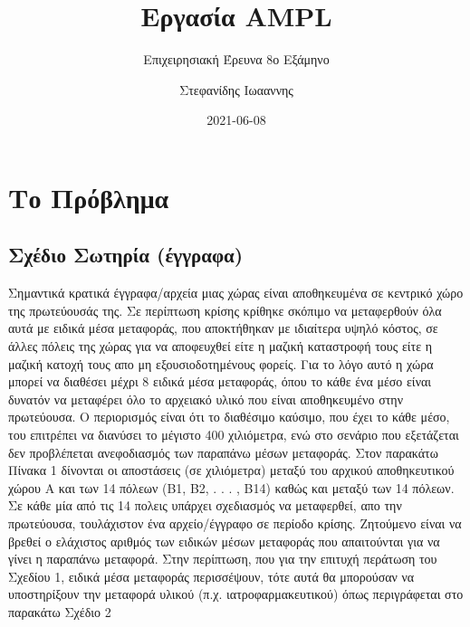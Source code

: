 \documentclass[
]{article}
\title{Εργασία AMPL}
\subtitle{Επιχειρησιακή Έρευνα 8ο Εξάμηνο}
\author{Στεφανίδης Ιωααννης}
\date{2021-06-08}
\begin{document}
\maketitle

{
\setcounter{tocdepth}{2}
\tableofcontents
}
\hypertarget{ux3c4ux3bf-ux3c0ux3c1ux3ccux3b2ux3bbux3b7ux3bcux3b1}{%
\section{Το Πρόβλημα}\label{ux3c4ux3bf-ux3c0ux3c1ux3ccux3b2ux3bbux3b7ux3bcux3b1}}

\hypertarget{ux3c3ux3c7ux3adux3b4ux3b9ux3bf-ux3c3ux3c9ux3c4ux3b7ux3c1ux3afux3b1-ux3adux3b3ux3b3ux3c1ux3b1ux3c6ux3b1}{%
\subsection{Σχέδιο Σωτηρία (έγγραφα)}\label{ux3c3ux3c7ux3adux3b4ux3b9ux3bf-ux3c3ux3c9ux3c4ux3b7ux3c1ux3afux3b1-ux3adux3b3ux3b3ux3c1ux3b1ux3c6ux3b1}}

Σημαντικά κρατικά έγγραφα/αρχεία μιας χώρας είναι αποθηκευμένα σε κεντρικό χώρο
της πρωτεύουσάς της. Σε περίπτωση κρίσης κρίθηκε σκόπιμο να μεταφερθούν όλα
αυτά με ειδικά μέσα μεταφοράς, που αποκτήθηκαν με ιδιαίτερα υψηλό κόστος, σε
άλλες πόλεις της χώρας για να αποφευχθεί είτε η μαζική καταστροφή τους είτε η
μαζική κατοχή τους απο μη εξουσιοδοτημένους φορείς. Για το λόγο αυτό η χώρα
μπορεί να διαθέσει μέχρι 8 ειδικά μέσα μεταφοράς, όπου το κάθε ένα μέσο είναι
δυνατόν να μεταφέρει όλο το αρχειακό υλικό που είναι αποθηκευμένο στην
πρωτεύουσα. Ο περιορισμός είναι ότι το διαθέσιμο καύσιμο, που έχει το κάθε
μέσο, του επιτρέπει να διανύσει το μέγιστο 400 χιλιόμετρα, ενώ στο σενάριο που
εξετάζεται δεν προβλέπεται ανεφοδιασμός των παραπάνω μέσων μεταφοράς. Στον
παρακάτω Πίνακα 1 δίνονται οι αποστάσεις (σε χιλιόμετρα) μεταξύ του αρχικού
αποθηκευτικού χώρου Α και των 14 πόλεων (B1, B2, . . . , B14) καθώς και μεταξύ
των 14 πόλεων. Σε κάθε μία από τις 14 πολεις υπάρχει σχεδιασμός να μεταφερθεί,
απο την πρωτεύουσα, τουλάχιστον ένα αρχείο/έγγραφο σε περίοδο κρίσης. Ζητούμενο
είναι να βρεθεί ο ελάχιστος αριθμός των ειδικών μέσων μεταφοράς που απαιτούνται
για να γίνει η παραπάνω μεταφορά. Στην περίπτωση, που για την επιτυχή περάτωση
του Σχεδίου 1, ειδικά μέσα μεταφοράς περισσέψουν, τότε αυτά θα μπορούσαν να
υποστηρίξουν την μεταφορά υλικού (π.χ. ιατροφαρμακευτικού) όπως περιγράφεται
στο παρακάτω Σχέδιο 2

 
  \providecommand{\huxb}[2]{\arrayrulecolor[RGB]{#1}\global\arrayrulewidth=#2pt}
  \providecommand{\huxvb}[2]{\color[RGB]{#1}\vrule width #2pt}
  \providecommand{\huxtpad}[1]{\rule{0pt}{#1}}
  \providecommand{\huxbpad}[1]{\rule[-#1]{0pt}{#1}}
\end{document}
